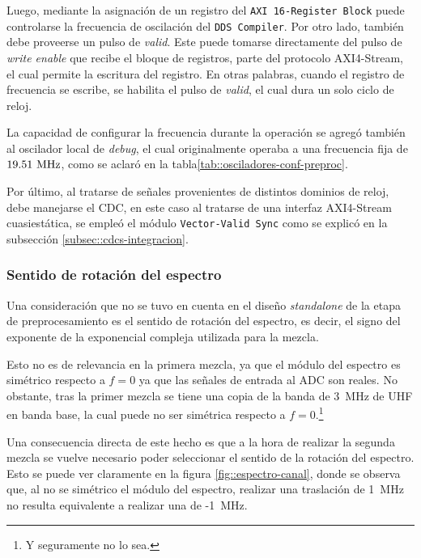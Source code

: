 \documentclass[../../main.tex]{subfiles}
\begin{document}
Luego, mediante la asignación de un registro del \texttt{AXI 16-Register Block} puede controlarse la frecuencia de oscilación del \texttt{DDS Compiler}. Por otro lado, también debe proveerse un pulso de \textit{valid}. Este puede tomarse directamente del pulso de \textit{write enable} que recibe el bloque de registros, parte del protocolo AXI4-Stream, el cual permite la escritura del registro. En otras palabras, cuando el registro de frecuencia se escribe, se habilita el pulso de \textit{valid}, el cual dura un solo ciclo de reloj.

La capacidad de configurar la frecuencia durante la operación se agregó también al oscilador local de \textit{debug}, el cual originalmente operaba a una frecuencia fija de $19.51~\textrm{MHz}$, como se aclaró en la tabla\ref{tab::osciladores-conf-preproc}.

Por último, al tratarse de señales provenientes de distintos dominios de reloj, debe manejarse el CDC, en este caso al tratarse de una interfaz AXI4-Stream cuasiestática, se empleó el módulo \texttt{Vector-Valid Sync} como se explicó en la subsección \ref{subsec::cdcs-integracion}.


\subsubsection{Sentido de rotación del espectro}
Una consideración que no se tuvo en cuenta en el diseño \textit{standalone} de la etapa de preprocesamiento es el sentido de rotación del espectro, es decir, el signo del exponente de la exponencial compleja utilizada para la mezcla.

Esto no es de relevancia en la primera mezcla, ya que el módulo del espectro es simétrico respecto a $f=0$ ya que las señales de entrada al ADC son reales. No obstante, tras la primer mezcla se tiene una copia de la banda de 3~MHz de UHF en banda base, la cual puede no ser simétrica respecto a $f= 0$.\footnote{Y seguramente no lo sea.}

Una consecuencia directa de este hecho es que a la hora de realizar la segunda mezcla se vuelve necesario poder seleccionar el sentido de la rotación del espectro. Esto se puede ver claramente en la figura \ref{fig::espectro-canal}, donde se observa que, al no se simétrico el módulo del espectro, realizar una traslación de 1~MHz no resulta equivalente a realizar una de -1~MHz.
\end{document}
